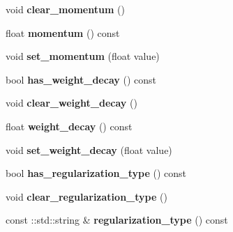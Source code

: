 \begin{DoxyCompactItemize}
\item 
\mbox{\label{classcaffe_1_1_solver_parameter_ae7edf4d45aaf92e3996f6ed7d3a73753}} 
void {\bfseries clear\+\_\+momentum} ()
\item 
\mbox{\label{classcaffe_1_1_solver_parameter_a6b1a58f35960095598a20797568efa1e}} 
float {\bfseries momentum} () const
\item 
\mbox{\label{classcaffe_1_1_solver_parameter_a57bca7393b76e0c6da7b58c1ebc674e0}} 
void {\bfseries set\+\_\+momentum} (float value)
\item 
\mbox{\label{classcaffe_1_1_solver_parameter_a8067458162521b69549d5244ebf6c05a}} 
bool {\bfseries has\+\_\+weight\+\_\+decay} () const
\item 
\mbox{\label{classcaffe_1_1_solver_parameter_a9579c7b8b33bbc0a922518e11dff87cf}} 
void {\bfseries clear\+\_\+weight\+\_\+decay} ()
\item 
\mbox{\label{classcaffe_1_1_solver_parameter_af3fa9725738e88ff68df9037eb60f17d}} 
float {\bfseries weight\+\_\+decay} () const
\item 
\mbox{\label{classcaffe_1_1_solver_parameter_ad69f845b1c69a8773f45c84cf28981d4}} 
void {\bfseries set\+\_\+weight\+\_\+decay} (float value)
\item 
\mbox{\label{classcaffe_1_1_solver_parameter_a4f756d6d7bfc47191ae8c55c0fd57355}} 
bool {\bfseries has\+\_\+regularization\+\_\+type} () const
\item 
\mbox{\label{classcaffe_1_1_solver_parameter_a17397a1cf22044ccac398c99479ebe4f}} 
void {\bfseries clear\+\_\+regularization\+\_\+type} ()
\item 
\mbox{\label{classcaffe_1_1_solver_parameter_a0d15b124643bd879a13cd93b7d4daf6c}} 
const \+::std\+::string \& {\bfseries regularization\+\_\+type} () const
\item 

\end{DoxyCompactItemize}
